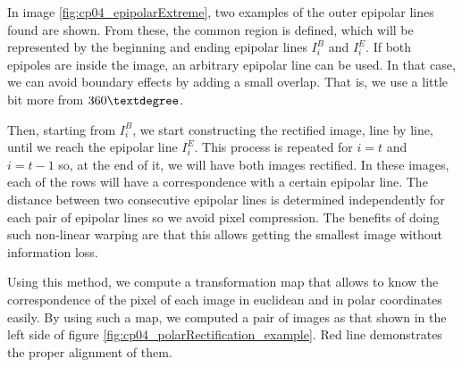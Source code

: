 \begin{framed}
In image \ref{fig:cp04_epipolarExtreme}, two examples of the outer epipolar lines found are shown. From these, the common region is defined, which will be represented by the beginning and ending epipolar lines $I_i^B$ and $I_i^E$. If both epipoles are inside the image, an arbitrary epipolar line can be used. In that case, we can avoid boundary effects by adding a small overlap. That is, we use a little bit more from $360\textdegree$.

Then, starting from $I_i^B$, we start constructing the rectified image, line by line, until we reach the epipolar line $I_i^E$. This process is repeated for $i=t$ and $i=t-1$ so, at the end of it, we will have both images rectified. In these images, each of the rows will have a correspondence with a certain epipolar line. The distance between two consecutive epipolar lines is determined independently for each pair of epipolar lines so we avoid pixel compression. The benefits of doing such non-linear warping are that this allows getting the smallest image without information loss.

Using this method, we compute a transformation map that allows to know the correspondence of the pixel of each image in euclidean and in polar coordinates easily. By using such a map, we computed a pair of images as that shown in the left side of figure \ref{fig:cp04_polarRectification_example}. Red line demonstrates the proper alignment of them. 


\end{framed}
